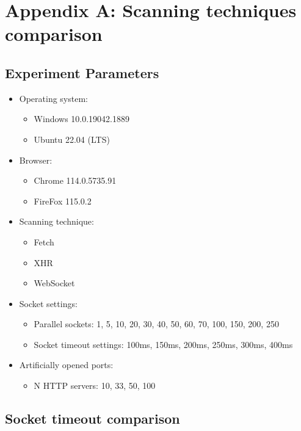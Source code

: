 \chapter{Appendix A: Scanning techniques comparison}
\label{appendix:appendix-a}

\section{Experiment Parameters}
\label{appendix:expirement-parameters}
\begin{itemize}
\item Operating system:
    \begin{itemize}
    \item Windows 10.0.19042.1889
    \item Ubuntu 22.04 (LTS)
    \end{itemize}
\item Browser:
    \begin{itemize}
    \item Chrome 114.0.5735.91
    \item FireFox 115.0.2
    \end{itemize}
\item Scanning technique:
    \begin{itemize}
    \item Fetch
    \item XHR
    \item WebSocket
    \end{itemize}
\item Socket settings:
    \begin{itemize}
    \item Parallel sockets: 1, 5, 10, 20, 30, 40, 50, 60, 70, 100, 150, 200, 250
    \item Socket timeout settings: 100ms, 150ms, 200ms, 250ms, 300ms, 400ms 
    \end{itemize}
\item Artificially opened ports:
    \begin{itemize}
    \item N HTTP servers: 10, 33, 50, 100
    \end{itemize}
\end{itemize}

\clearpage
\section{Socket timeout comparison}

